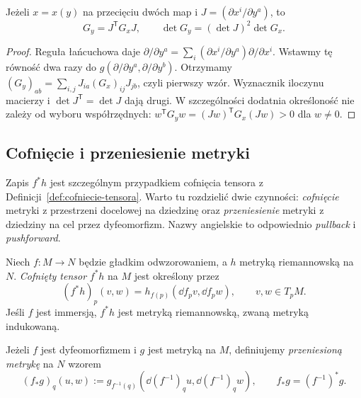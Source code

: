 \begin{stwierdzenie}
\label{prop:metryka-zmiana}
Jeżeli $x=x(y)$ na przecięciu dwóch map i
$J=(\partial x^i/\partial y^a)$, to
\[
 G_y=J^{\mathsf T}G_xJ,\qquad
 \det G_y=(\det J)^2\det G_x.
\]
\end{stwierdzenie}
\begin{proof}
Reguła łańcuchowa daje
$\partial/\partial y^a
 =\sum_i(\partial x^i/\partial y^a)\partial/\partial x^i$.
Wstawmy tę równość dwa razy do
$g(\partial/\partial y^a,\partial/\partial y^b)$.
Otrzymamy
$(G_y)_{ab}=\sum_{i,j}J_{ia}(G_x)_{ij}J_{jb}$,
czyli pierwszy wzór. Wyznacznik iloczynu macierzy
i $\det J^{\mathsf T}=\det J$ dają drugi.
W szczególności dodatnia określoność nie zależy
od wyboru współrzędnych: $w^{\mathsf T}G_yw
=(Jw)^{\mathsf T}G_x(Jw)>0$ dla $w\ne0$.
\end{proof}

\subsection*{Cofnięcie i przeniesienie metryki}
\label{subsec:metryka-pullback-pushforward}

Zapis $f^*h$ jest szczególnym przypadkiem cofnięcia
tensora z Definicji~\ref{def:cofniecie-tensora}.
Warto tu rozdzielić dwie czynności: \emph{cofnięcie}
metryki z przestrzeni docelowej na dziedzinę oraz
\emph{przeniesienie} metryki z dziedziny na cel przez
dyfeomorfizm. Nazwy angielskie to odpowiednio
\emph{pullback} i \emph{pushforward}.

\begin{definicja}
\label{def:metryka-pullback-pushforward}
Niech $f:M\to N$ będzie gładkim odwzorowaniem, a $h$
metryką riemannowską na $N$. \emph{Cofnięty tensor}
$f^*h$ na $M$ jest określony przez
\begin{equation}\label{eq:metryka-pullback}
 (f^*h)_p(v,w)
 =h_{f(p)}(\dd f_pv,\dd f_pw),
 \qquad v,w\in T_pM.
\end{equation}
Jeśli $f$ jest immersją, $f^*h$ jest metryką
riemannowską, zwaną metryką indukowaną.

Jeżeli $f$ jest dyfeomorfizmem i $g$ jest metryką
na $M$, definiujemy \emph{przeniesioną metrykę}
na $N$ wzorem
\begin{equation}\label{eq:metryka-pushforward}
 (f_*g)_q(u,w)
 :=g_{f^{-1}(q)}(\dd(f^{-1})_q u,
                    \dd(f^{-1})_q w),
 \qquad f_*g=(f^{-1})^*g.
\end{equation}
\end{definicja}

